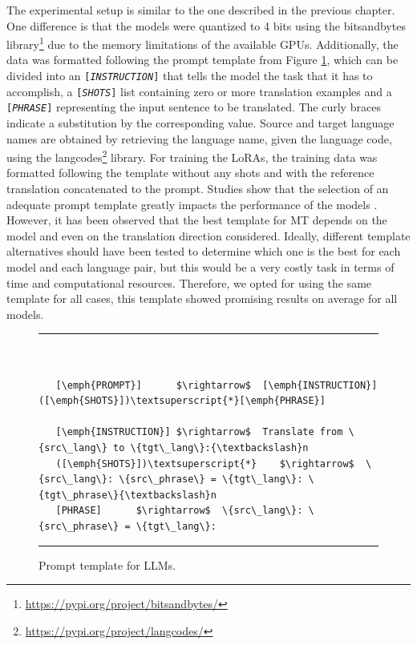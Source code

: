 \documentclass[11pt,english,listoffigures,listoftables]{tfgetsinf}
\begin{document}
The experimental setup is similar to the one described in the previous chapter. One difference is that the models were quantized to 4 bits using the bitsandbytes library\footnote{\url{https://pypi.org/project/bitsandbytes/}} due to the memory limitations of the available GPUs. Additionally, the data was formatted following the prompt template from Figure \ref{fig:prompts}, which can be divided into an \texttt{[\emph{INSTRUCTION}]} that tells the model the task that it has to accomplish, a \texttt{[\emph{SHOTS}]} list containing zero or more translation examples and a \texttt{[\emph{PHRASE}]} representing the input sentence to be translated. The curly braces indicate a substitution by the corresponding value. Source and target language names are obtained by retrieving the language name, given the language code, using the langcodes\footnote{\url{https://pypi.org/project/langcodes/}} library. For training the LoRAs, the training data was formatted following the template without any shots and with the reference translation concatenated to the prompt. Studies show that the selection of an adequate prompt template greatly impacts the performance of the models \cite{zhang2023prompting}. However, it has been observed that the best template for MT depends on the model and even on the translation direction considered. Ideally, different template alternatives should have been tested to determine which one is the best for each model and each language pair, but this would be a very costly task in terms of time and computational resources. Therefore, we opted for using the same template for all cases, this template showed promising results on average for all models. 



\newcommand{\promptHrule}{\vspace{0.1em} \hrule \vspace{0.1em}}
\newcommand\userinput[1]{\textbf{#1}}
\begin{figure}[h]
    \centering
    \promptHrule
    \begin{Verbatim}[commandchars=\\\{\},codes={\catcode`$=3\catcode`_=8}]


   [\emph{PROMPT}]      $\rightarrow$  [\emph{INSTRUCTION}]([\emph{SHOTS}])\textsuperscript{*}[\emph{PHRASE}]

   [\emph{INSTRUCTION}] $\rightarrow$  Translate from \{src\_lang\} to \{tgt\_lang\}:{\textbackslash}n
   ([\emph{SHOTS}])\textsuperscript{*}    $\rightarrow$  \{src\_lang\}: \{src\_phrase\} = \{tgt\_lang\}: \{tgt\_phrase\}{\textbackslash}n
   [PHRASE]      $\rightarrow$  \{src\_lang\}: \{src\_phrase\} = \{tgt\_lang\}: 

\end{Verbatim}

    \promptHrule
    \vspace{1em}
    \caption{Prompt template for LLMs.}
   \label{fig:prompts}
\end{figure}
\end{document}
